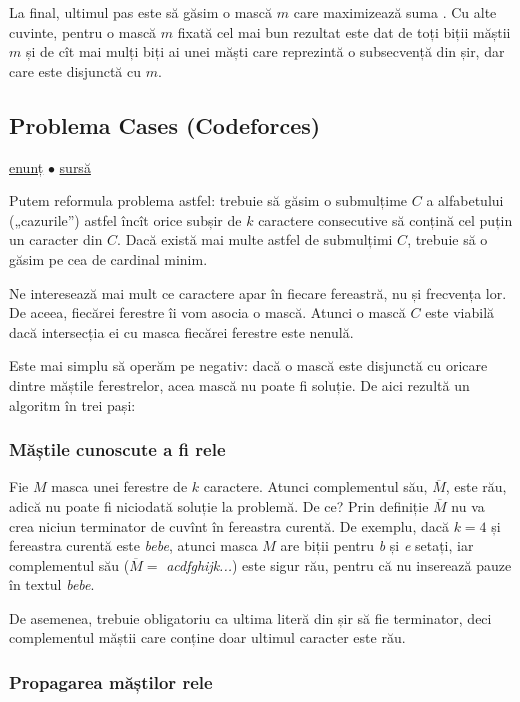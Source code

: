 La final, ultimul pas este să găsim o mască $m$ care maximizează suma . Cu alte cuvinte, pentru o mască $m$ fixată cel mai bun rezultat este dat de toți biții măștii $m$ și de cît mai mulți biți ai unei măști care reprezintă o subsecvență din șir, dar care este disjunctă cu $m$.


\subsection{Problema Cases (Codeforces)}
\label{problem:cases}

\href{https://codeforces.com/contest/1995/problem/D}{enunț}
$\bullet$
\hyperref[code:cases]{sursă}

Putem reformula problema astfel: trebuie să găsim o submulțime $C$ a alfabetului („cazurile”) astfel încît orice subșir de $k$ caractere consecutive să conțină cel puțin un caracter din $C$. Dacă există mai multe astfel de submulțimi $C$, trebuie să o găsim pe cea de cardinal minim.

Ne interesează mai mult ce caractere apar în fiecare fereastră, nu și frecvența lor. De aceea, fiecărei ferestre îi vom asocia o mască. Atunci o mască $C$ este viabilă dacă intersecția ei cu masca fiecărei ferestre este nenulă.

Este mai simplu să operăm pe negativ: dacă o mască este disjunctă cu oricare dintre măștile ferestrelor, acea mască nu poate fi soluție. De aici  rezultă un algoritm în trei pași:

\subsubsection*{Măștile cunoscute a fi rele}

Fie $M$ masca unei ferestre de $k$ caractere. Atunci complementul său, $\overline{M}$, este rău, adică nu poate fi niciodată soluție la problemă. De ce? Prin definiție $\overline{M}$ nu va crea niciun terminator de cuvînt în fereastra curentă. De exemplu, dacă $k = 4$ și fereastra curentă este \textit{bebe}, atunci masca $M$ are biții pentru \textit{b} și \textit{e} setați, iar complementul său ($\overline{M} =$ \textit{acdfghijk...}) este sigur rău, pentru că nu inserează pauze în textul \textit{bebe}.

De asemenea, trebuie obligatoriu ca ultima literă din șir să fie terminator, deci complementul măștii care conține doar ultimul caracter este rău.

\subsubsection*{Propagarea măștilor rele}


